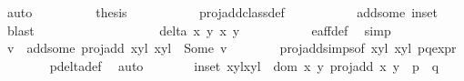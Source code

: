 \begin{isabellebody}
\ auto\isanewline
\ \ \ \ \ \ \isamarkupfalse%
\ \isamarkupfalse%
\ {\isacharquery}thesis\ \isanewline
\ \ \ \ \ \ \ \ \isamarkupfalse%
\ proj{\isacharunderscore}add{\isacharunderscore}class{\isacharunderscore}def\ \isanewline
\ \ \ \ \ \ \ \ \isamarkupfalse%
\ add{\isacharunderscore}some\ in{\isacharunderscore}set\ \isamarkupfalse%
\ blast\isanewline
\ \ \isamarkupfalse%
\isanewline
\ \ \isamarkupfalse%
\isanewline
\ \ \ \ \isamarkupfalse%
\ {}\isanewline
\ \ \ \ \isamarkupfalse%
\ \isamarkupfalse%
\ {\isachardoublequoteopen}delta\ x\ y\ x{\isacharprime}\ y{\isacharprime}\ {\isasymnoteq}\ {}{\isachardoublequoteclose}\ \isanewline
\ \ \ \ \ \ \isamarkupfalse%
\ e{\isacharunderscore}aff{\isacharunderscore}{}{\isacharunderscore}def\ \isamarkupfalse%
\ simp\isanewline
\ \ \ \ \isamarkupfalse%
\ \isamarkupfalse%
\ v\ \ add{\isacharunderscore}some{\isacharcolon}\ {\isachardoublequoteopen}proj{\isacharunderscore}add\ {\isacharparenleft}{\isacharparenleft}x{\isacharcomma}y{\isacharparenright}{\isacharcomma}l{\isacharparenright}\ {\isacharparenleft}{\isacharparenleft}x{\isacharprime}{\isacharcomma}y{\isacharprime}{\isacharparenright}{\isacharcomma}l{\isacharprime}{\isacharparenright}\ {\isacharequal}\ Some\ v{\isachardoublequoteclose}\isanewline
\ \ \ \ \ \ \isamarkupfalse%
\ proj{\isacharunderscore}add{\isachardot}simps{\isacharbrackleft}of\ {\isachardoublequoteopen}{\isacharparenleft}{\isacharparenleft}x{\isacharcomma}y{\isacharparenright}{\isacharcomma}l{\isacharparenright}{\isachardoublequoteclose}\ {\isachardoublequoteopen}{\isacharparenleft}{\isacharparenleft}x{\isacharprime}{\isacharcomma}y{\isacharprime}{\isacharparenright}{\isacharcomma}l{\isacharprime}{\isacharparenright}{\isachardoublequoteclose}{\isacharbrackright}\ p{\isacharunderscore}q{\isacharunderscore}expr\isanewline
\ \ \ \ \ \ \isamarkupfalse%
\ p{\isacharunderscore}delta{\isacharunderscore}def\ \isamarkupfalse%
\ auto\isanewline
\ \ \ \ \isamarkupfalse%
\ \isamarkupfalse%
\ in{\isacharunderscore}set{\isacharcolon}\ {\isachardoublequoteopen}{\isacharparenleft}{\isacharparenleft}{\isacharparenleft}x{\isacharcomma}y{\isacharparenright}{\isacharcomma}l{\isacharparenright}{\isacharcomma}{\isacharparenleft}{\isacharparenleft}x{\isacharprime}{\isacharcomma}y{\isacharprime}{\isacharparenright}{\isacharcomma}l{\isacharprime}{\isacharparenright}{\isacharparenright}\ {\isasymin}\ {\isacharparenleft}dom\ {\isacharparenleft}{\isasymlambda}{\isacharparenleft}x{\isacharcomma}\ y{\isacharparenright}{\isachardot}\ proj{\isacharunderscore}add\ x\ y{\isacharparenright}\ {\isasyminter}\ p\ {\isasymtimes}\ q{\isacharparenright}{\isachardoublequoteclose}\isanewline

\end{isabellebody}
